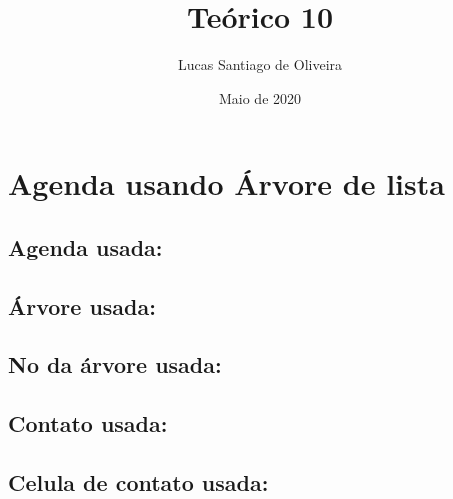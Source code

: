 \documentclass{article}
\title{Teórico 10}
\author{Lucas Santiago de Oliveira}
\date{Maio de 2020}
\begin{document}
\maketitle

\section{Agenda usando Árvore de lista}
\subsection{Agenda usada:}

\vspace{1cm}

\subsection{Árvore usada:}

\vspace{1cm}

\subsection{No da árvore usada:}

\vspace{1cm}

\subsection{Contato usada:}

\vspace{1cm}

\subsection{Celula de contato usada:}

\vspace{1cm}
\end{document}
